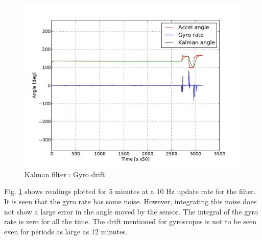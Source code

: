 \begin{figure}[!h]
\centering
\includegraphics[scale=0.8]{fig/kalman_drift.pdf}
\caption{Kalman filter : Gyro drift}
\label{fig:5_kalman_gyrodrift}
\end{figure}
\newpage
Fig. \ref{fig:5_kalman_gyrodrift} shows readings plotted for 5 minutes at a 10 Hz update rate for the filter. It is seen that the
gyro rate has some noise. However, integrating this noise does not show a large error in the angle moved by the sensor. The
integral of the gyro rate is zero for all the time. The drift mentioned for gyroscopes is not to be seen even for periods as large as
12 minutes.

